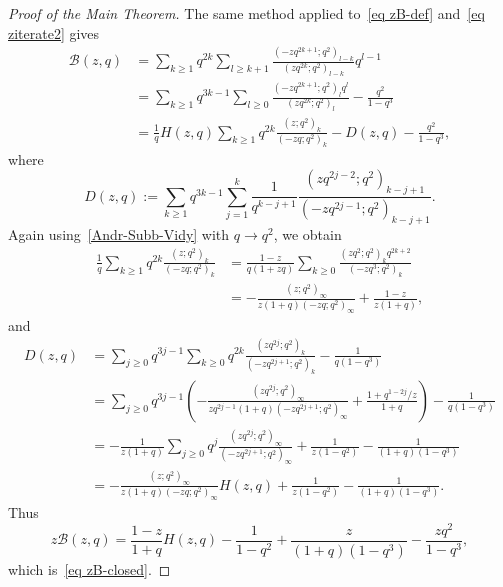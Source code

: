 \documentclass[reqno]{amsart}
\theoremstyle{definition}
\theoremstyle{plain}
\theoremstyle{remark}
\numberwithin{equation}{section}
\begin{document}
\begin{proof}[Proof of the Main Theorem]
The same method applied to~\eqref{eq zB-def} and~\eqref{eq ziterate2} gives
\begin{align*}
\mathcal B(z,q)
&=\sum_{k\ge 1}q^{2k}\sum_{l\ge k+1}
\frac{(-zq^{2k+1};q^2)_{l-k}}{(zq^{2k};q^2)_{l-k}}q^{l-1}\\
&=\sum_{k\ge 1}q^{3k-1}\sum_{l\ge 0}
\frac{(-zq^{2k+1};q^2)_l q^l}{(zq^{2k};q^2)_l}-\frac{q^2}{1-q^3}\\
&=\frac{1}{q}H(z,q)\sum_{k\ge 1}q^{2k}\frac{(z;q^2)_k}{(-zq;q^2)_k}
-D(z,q)-\frac{q^2}{1-q^3},
\end{align*}
where
\[
D(z,q):=\sum_{k\ge 1}q^{3k-1}\sum_{j=1}^k\frac{1}{q^{k-j+1}}
\frac{(zq^{2j-2};q^2)_{k-j+1}}{(-zq^{2j-1};q^2)_{k-j+1}}.
\]
Again using~\eqref{Andr-Subb-Vidy} with $q\to q^2$, we obtain
\begin{align*}
\frac{1}{q}\sum_{k\ge 1}q^{2k}\frac{(z;q^2)_k}{(-zq;q^2)_k}
&=\frac{1-z}{q(1+zq)}\sum_{k\ge 0}\frac{(zq^2;q^2)_k q^{2k+2}}{(-zq^3;q^2)_k}\\
&=-\frac{(z;q^2)_\infty}{z(1+q)(-zq;q^2)_\infty}+\frac{1-z}{z(1+q)},
\end{align*}
and
\begin{align*}
D(z,q)
&=\sum_{j\ge 0}q^{3j-1}\sum_{k\ge 0}q^{2k}\frac{(zq^{2j};q^2)_k}{(-zq^{2j+1};q^2)_k}-\frac{1}{q(1-q^3)}\\
&=\sum_{j\ge 0}q^{3j-1}
\left(
-\frac{(zq^{2j};q^2)_\infty}{zq^{2j-1}(1+q)(-zq^{2j+1};q^2)_\infty}
+\frac{1+q^{1-2j}/z}{1+q}
\right)-\frac{1}{q(1-q^3)}\\
&=-\frac{1}{z(1+q)}\sum_{j\ge 0}q^j
\frac{(zq^{2j};q^2)_\infty}{(-zq^{2j+1};q^2)_\infty}
+\frac{1}{z(1-q^2)}-\frac{1}{(1+q)(1-q^3)}\\
&=-\frac{(z;q^2)_\infty}{z(1+q)(-zq;q^2)_\infty}H(z,q)
+\frac{1}{z(1-q^2)}-\frac{1}{(1+q)(1-q^3)}.
\end{align*}
Thus
\[
z\mathcal B(z,q)=\frac{1-z}{1+q}H(z,q)-\frac{1}{1-q^2}
+\frac{z}{(1+q)(1-q^3)}-\frac{zq^2}{1-q^3},
\]
which is~\eqref{eq zB-closed}.


\end{proof}
\end{document}
